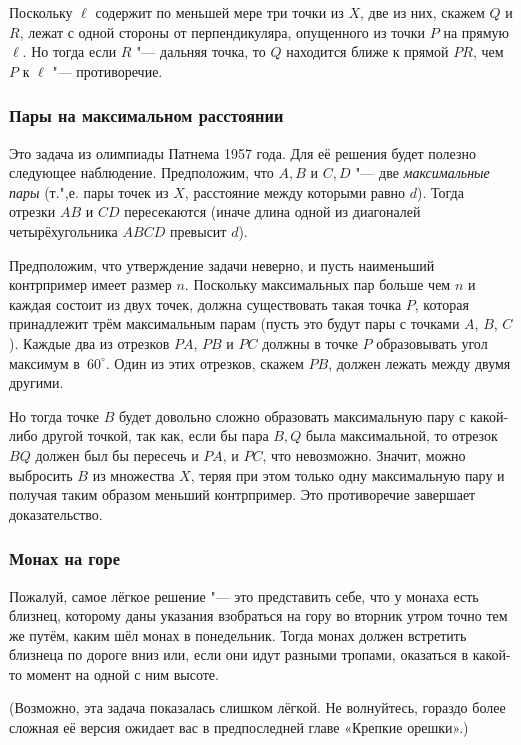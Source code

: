 \documentclass[twoside]{book}
\begin{document}
Поскольку $\ell$ содержит по меньшей мере три точки из $X$, две из них, скажем $Q$ и $R$, лежат с одной стороны от перпендикуляра, опущенного из точки $P$ на прямую $\ell$.
Но тогда если $R$ "--- дальняя точка, то $Q$ находится ближе к прямой $PR$, чем $P$ к $\ell$ "--- противоречие.\heart

\subsubsection*{Пары на максимальном расстоянии}%

Это задача из олимпиады Патнема 1957 года.
Для её решения будет полезно следующее наблюдение.
Предположим, что $A,B$ и $C,D$ "--- две \emph{максимальные пары} (т.",е. пары точек из $X$, расстояние между которыми равно $d$).
Тогда отрезки $AB$ и $CD$ пересекаются (иначе длина одной из диагоналей четырёхугольника $ABCD$ превысит $d$).

Предположим, что утверждение задачи неверно, и пусть наименьший контрпример имеет размер $n$.
Поскольку максимальных пар больше чем $n$ и каждая состоит из двух точек,  должна существовать такая точка $P$, которая принадлежит трём максимальным парам (пусть это будут пары с точками $A$, $B$, $C$).
Каждые два из отрезков $PA$, $PB$ и $PC$ должны в точке $P$ образовывать угол максимум в~$60^\circ$.
Один из этих отрезков, скажем $PB$, %
должен лежать между двумя другими.

Но тогда точке $B$ будет довольно сложно образовать максимальную пару с какой-либо другой точкой, так как, если бы пара $B,Q$ была максимальной, то отрезок $BQ$ должен был бы пересечь и $PA$, и $PC$, что невозможно.
Значит, можно выбросить $B$ из множества $X$, теряя при этом только одну максимальную пару и получая таким образом меньший контрпример.
Это противоречие завершает доказательство.\heart

\subsubsection*{Монах на горе}%

Пожалуй, самое лёгкое решение "--- это представить себе, что у монаха есть близнец, которому даны указания взобраться на гору во вторник утром точно тем же путём, каким шёл монах в понедельник.
Тогда монах должен встретить близнеца по дороге вниз или, если они идут разными тропами, оказаться в какой-то момент на одной с ним высоте.\heart

(Возможно, эта задача показалась слишком лёгкой.
Не волнуйтесь, гораздо более сложная её версия ожидает вас в предпоследней главе «Крепкие орешки».)
\end{document}
